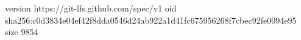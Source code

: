 version https://git-lfs.github.com/spec/v1
oid sha256:c0d3834e04ef42f8dda0546d24ab922a1d41fc675956268f7cbec92fe0094e95
size 9854
